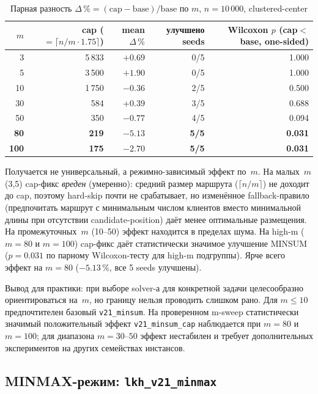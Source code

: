\documentclass[14pt,a4paper]{extarticle}
\begin{document}
\begin{table}[H]
\centering
\caption{Парная разность $\Delta\,\% = (\mathrm{cap} - \mathrm{base})/\mathrm{base}$ по $m$, $n=10\,000$, clustered-center}
\small
\begin{tabular}{rrrrr}
\toprule
$m$ & cap ($=\lceil n/m \cdot 1.75 \rceil$) & mean $\Delta\,\%$ & улучшено seeds & Wilcoxon $p$ (cap$<$base, one-sided)\\
\midrule
3   & 5\,833 & $+0.69$ & 0/5 & 1.000\\
5   & 3\,500 & $+1.90$ & 0/5 & 1.000\\
10  & 1\,750 & $-0.36$ & 2/5 & 0.500\\
30  &   584  & $+0.39$ & 3/5 & 0.688\\
50  &   350  & $-0.77$ & 4/5 & 0.094\\
\textbf{80}  & \textbf{219}  & \textbf{$-5.13$} & \textbf{5/5} & \textbf{0.031}\\
\textbf{100} & \textbf{175}  & \textbf{$-2.70$} & \textbf{5/5} & \textbf{0.031}\\
\bottomrule
\end{tabular}
\normalsize
\end{table}

Получается не универсальный, а режимно-зависимый эффект по~$m$. На малых~$m$ (3,5) cap-фикс \emph{вреден} (умеренно): средний размер маршрута ($\lceil n/m \rceil$) не доходит до cap, поэтому hard-skip почти не срабатывает, но изменённое fallback-правило (предпочитать маршрут с минимальным числом клиентов вместо минимальной длины при отсутствии candidate-position) даёт менее оптимальные размещения. На промежуточных~$m$ (10--50) эффект находится в пределах шума. На high-m ($m=80$ и $m=100$) cap-фикс даёт статистически значимое улучшение MINSUM ($p = 0.031$ по парному Wilcoxon-тесту для high-m подгруппы). Ярче всего эффект на $m=80$ ($-5.13\,\%$, все 5 seeds улучшены).

Вывод для практики: при выборе solver-а для конкретной задачи целесообразно ориентироваться на~$m$, но границу нельзя проводить слишком рано. Для $m \leq 10$ предпочтителен базовый \texttt{v21\_minsum}. На проверенном m-sweep статистически значимый положительный эффект \texttt{v21\_minsum\_cap} наблюдается при $m=80$ и $m=100$; для диапазона $m=30$--$50$ эффект нестабилен и требует дополнительных экспериментов на других семействах инстансов.

\subsection{MINMAX-режим: \texttt{lkh\_v21\_minmax}}
\end{document}
